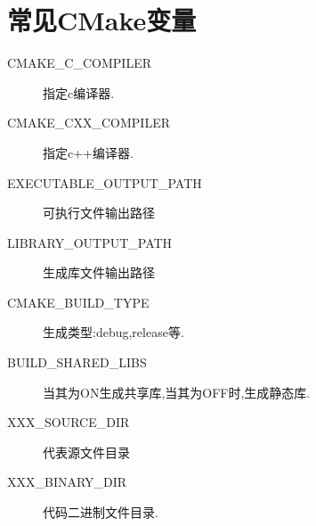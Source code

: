 \documentclass{ctexart}
\begin{document}
\section{常见CMake变量}
\begin{description}
\item[CMAKE\_C\_COMPILER] 指定c编译器.
\item[CMAKE\_CXX\_COMPILER] 指定c++编译器.
\item[EXECUTABLE\_OUTPUT\_PATH] 可执行文件输出路径
\item[LIBRARY\_OUTPUT\_PATH] 生成库文件输出路径
\item[CMAKE\_BUILD\_TYPE] 生成类型:debug,release等.
\item[BUILD\_SHARED\_LIBS] 当其为ON生成共享库,当其为OFF时,生成静态库.
\item[XXX\_SOURCE\_DIR] 代表源文件目录
\item[XXX\_BINARY\_DIR] 代码二进制文件目录.
\end{description}
\end{document}
